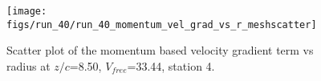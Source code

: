 \begin{figure}[H]
\centering
\texttt{[image: figs/run\_40/run\_40\_momentum\_vel\_grad\_vs\_r\_meshscatter]}
\caption{Scatter plot of the momentum based velocity gradient term vs radius at $z/c$=8.50, $V_{free}$=33.44, station 4.}
\label{fig:run_40_momentum_vel_grad_vs_r_meshscatter}
\end{figure}


